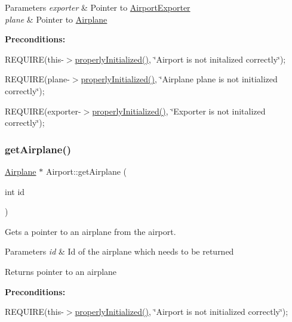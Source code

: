 \begin{DoxyParams}{Parameters}
{\em exporter} & Pointer to \mbox{\hyperlink{class_airport_exporter}{Airport\+Exporter}} \\
\hline
{\em plane} & Pointer to \mbox{\hyperlink{class_airplane}{Airplane}}\\
\hline
\end{DoxyParams}
{\bfseries Preconditions\+:}
\begin{DoxyItemize}
\item R\+E\+Q\+U\+I\+RE(this-\/$>$\mbox{\hyperlink{class_airport_aa13e68ac58e8875837fbe888325cfff6}{properly\+Initialized()}}, \char`\"{}\+Airport is not initalized correctly\char`\"{});
\item R\+E\+Q\+U\+I\+RE(plane-\/$>$\mbox{\hyperlink{class_airport_aa13e68ac58e8875837fbe888325cfff6}{properly\+Initialized()}}, \char`\"{}\+Airplane \textquotesingle{}plane\textquotesingle{} is not initialized correctly\char`\"{});
\item R\+E\+Q\+U\+I\+RE(exporter-\/$>$\mbox{\hyperlink{class_airport_aa13e68ac58e8875837fbe888325cfff6}{properly\+Initialized()}}, \char`\"{}\+Exporter is not initalized correctly\char`\"{}); 
\end{DoxyItemize}\mbox{\label{class_airport_a29db3fa31b450d90b9a81c9c55d4a320}} 
\subsubsection{\texorpdfstring{get\+Airplane()}{getAirplane()}}
{\footnotesize\ttfamily \mbox{\hyperlink{class_airplane}{Airplane}} $\ast$ Airport\+::get\+Airplane (\begin{DoxyParamCaption}\item[{int}]{id }\end{DoxyParamCaption})}



Gets a pointer to an airplane from the airport. 


\begin{DoxyParams}{Parameters}
{\em id} & Id of the airplane which needs to be returned \\
\hline
\end{DoxyParams}
\begin{DoxyReturn}{Returns}
pointer to an airplane
\end{DoxyReturn}
{\bfseries Preconditions\+:}
\begin{DoxyItemize}
\item R\+E\+Q\+U\+I\+RE(this-\/$>$\mbox{\hyperlink{class_airport_aa13e68ac58e8875837fbe888325cfff6}{properly\+Initialized()}}, \char`\"{}\+Airport is not initialized correctly\char`\"{}); 
\end{DoxyItemize}\mbox{\label{class_airport_a1c2d6645864e47ff409ea9233add81d4}} 
